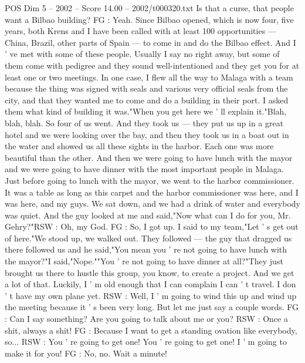 \begin{textsample}{POS Dim 5 – 2002 – Score 14.00 – 2002/t000320.txt}
Is that a curse, that people want a Bilbao building?
FG : Yeah.
Since Bilbao opened, which is now four, five years, both Krens and I have been called with at least 100 opportunities — China, Brazil, other parts of Spain — to come in and do the Bilbao effect.
And I ' ve met with some of these people.
Usually I say no right away, but some of them come with pedigree and they sound well-intentioned and they get you for at least one or two meetings.
In one case, I flew all the way to Malaga with a team because the thing was signed with seals and various very official seals from the city, and that they wanted me to come and do a building in their port.
I asked them what kind of building it was."When you get here we ' ll explain it."Blah, blah, blah.
So four of us went.
And they took us — they put us up in a great hotel and we were looking over the bay, and then they took us in a boat out in the water and showed us all these sights in the harbor.
Each one was more beautiful than the other.
And then we were going to have lunch with the mayor and we were going to have dinner with the most important people in Malaga.
Just before going to lunch with the mayor, we went to the harbor commissioner.
It was a table as long as this carpet and the harbor commissioner was here, and I was here, and my guys.
We sat down, and we had a drink of water and everybody was quiet.
And the guy looked at me and said,"Now what can I do for you, Mr.
Gehry?"RSW : Oh, my God.
FG : So, I got up.
I said to my team,"Let ' s get out of here."We stood up, we walked out.
They followed — the guy that dragged us there followed us and he said,"You mean you ' re not going to have lunch with the mayor?"I said,"Nope.""You ' re not going to have dinner at all?"They just brought us there to hustle this group, you know, to create a project.
And we get a lot of that.
Luckily, I ' m old enough that I can complain I can ' t travel.
I don ' t have my own plane yet.
RSW : Well, I ' m going to wind this up and wind up the meeting because it ' s been very long.
But let me just say a couple words.
FG : Can I say something?
Are you going to talk about me or you?
RSW : Once a shit, always a shit!
FG : Because I want to get a standing ovation like everybody, so...
RSW : You ' re going to get one!
You ' re going to get one!
I ' m going to make it for you!
FG : No, no.
Wait a minute!

\end{textsample}
